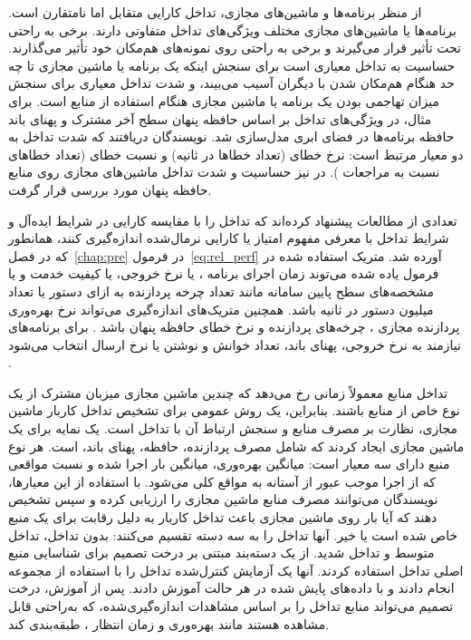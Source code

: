 از منظر برنامه‌ها و ماشین‌های مجازی، تداخل کارایی متقابل اما نامتقارن است. برنامه‌ها یا ماشین‌های مجازی مختلف ویژگی‌های تداخل متفاوتی دارند. برخی به ‌راحتی تحت تأثیر قرار می‌گیرند و برخی به ‌راحتی روی نمونه‌های هم‌مکان خود تأثیر می‌گذارند. حساسیت به تداخل معیاری است برای سنجش اینکه یک برنامه یا ماشین مجازی تا چه حد هنگام هم‌مکان شدن با دیگران آسیب می‌بیند، و شدت تداخل معیاری برای سنجش میزان تهاجمی بودن یک برنامه یا ماشین مجازی هنگام استفاده از منابع است. برای مثال، در \cite{kim2013vmconsolidation} ویژگی‌های تداخل بر اساس حافظه پنهان سطح آخر  مشترک و پهنای باند حافظه برنامه‌ها در فضای ابری مدل‌سازی شد. نویسندگان دریافتند که شدت تداخل به دو معیار مرتبط است: نرخ خطای  (تعداد خطاها در ثانیه) و نسبت خطای  (تعداد خطاهای  نسبت به مراجعات ). در \cite{Chen2016Cache} نیز حساسیت و شدت تداخل ماشین‌های مجازی روی منابع حافظه پنهان مورد بررسی قرار گرفت.

تعدادی از مطالعات پیشنهاد کرده‌اند که تداخل را با مقایسه کارایی در شرایط ایده‌آل و شرایط تداخل با معرفی مفهوم امتیاز یا کارایی نرمال‌شده اندازه‌گیری کنند\cite{novakovic2013deepdive, cheng2017precise}، همانطور که در فصل~\ref{chap:pre} در فرمول~\eqref{eq:rel_perf} آورده شد. متریک استفاده شده در فرمول یاده شده می‌توند زمان اجرای برنامه \cite{novakovic2013deepdive, Zhao2016Interference, Chen2017Prophet, Javadi2016UIE}، یا نرخ خروجی\cite{Chiang2011TRACON}، یا کیفیت خدمت \cite{Yang2013BubbleFluxConf} و یا مشخصه‌های سطح پایین سامانه مانند تعداد چرخه پردازنده به ازای دستور  یا تعداد میلیون دستور در ثانیه  \cite{novakovic2013deepdive, cheng2017precise, Zhang2013CPI2} باشد. همچنین متریک‌های اندازه‌گیری می‌تواند نرخ بهره‌وری پردازنده مجازی ، چرخه‌های پردازنده و نرخ خطای حافظه پنهان باشد \cite{Sun2014MVEI}. برای برنامه‌های نیازمند به  نرخ خروجی، پهنای باند، تعداد خوانش و نوشتن یا نرخ ارسال انتخاب می‌شود \cite{Casale2011StorageIO}.

تداخل منابع معمولاً زمانی رخ می‌دهد که چندین ماشین مجازی میزبان مشترک از یک نوع خاص از منابع باشند. بنابراین، یک روش عمومی برای تشخیص تداخل کاربار ماشین مجازی، نظارت بر مصرف منابع و سنجش ارتباط آن با تداخل است. \cite{Peng2018VMProfiling} یک نمایه برای یک ماشین مجازی ایجاد کردند که شامل مصرف پردازنده،‌ حافظه، پهنای باند،  است. هر نوع منبع دارای سه معیار است: میانگین بهره‌وری، میانگین بار اجرا شده و نسبت مواقعی که از اجرا موجب عبور از آستانه به مواقع کلی می‌شود. با استفاده از این معیارها، نویسندگان می‌توانند مصرف منابع ماشین مجازی را ارزیابی کرده و سپس تشخیص دهند که آیا بار روی ماشین مجازی باعث تداخل کاربار به دلیل رقابت برای یک منبع خاص شده است یا خیر. آنها تداخل را به سه دسته تقسیم می‌کنند: بدون تداخل، تداخل متوسط و تداخل شدید. \cite{Javadi2017DIAL} از یک دسته‌بند مبتنی بر درخت تصمیم برای شناسایی منبع اصلی تداخل استفاده کردند. آنها یک آزمایش کنترل‌شده تداخل را با استفاده از مجموعه  انجام دادند و با داده‌های پایش شده در هر حالت آموزش دادند. پس از آموزش، درخت تصمیم می‌تواند منابع تداخل را بر اساس مشاهدات اندازه‌گیری‌شده، که به‌راحتی قابل مشاهده هستند مانند بهره‌وری  و زمان انتظار ، طبقه‌بندی کند.

